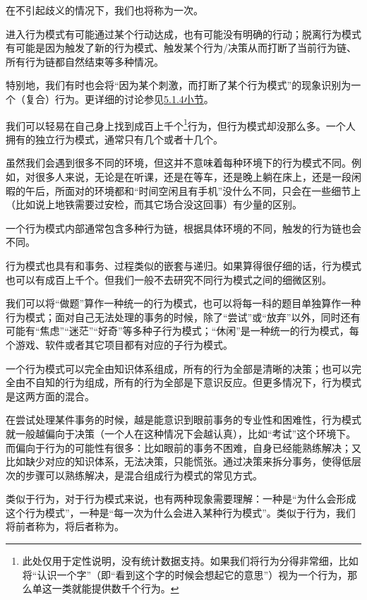 在不引起歧义的情况下，我们也将称为一次。
\begin{explain}
进入行为模式有可能通过某个行动达成，也有可能没有明确的行动；脱离行为模式有可能是因为触发了新的行为模式、触发某个行为/决策从而打断了当前行为链、所有行为链都自然结束等多种情况。

特别地，我们有时也会将“因为某个刺激，而打断了某个行为模式”的现象识别为一个（复合）行为。更详细的讨论参见\hyperref[sec:广义行为与多重触发]{5.1.4小节}。
\end{explain}
我们可以轻易在自己身上找到成百上千个\footnote{此处仅用于定性说明，没有统计数据支持。如果我们将行为分得非常细，比如将“认识一个字”（即“看到这个字的时候会想起它的意思”）视为一个行为，那么单这一类就能提供数千个行为。}行为，但行为模式却没那么多。一个人拥有的独立行为模式，通常只有几个或者十几个。
\begin{examples}
虽然我们会遇到很多不同的环境，但这并不意味着每种环境下的行为模式不同。例如，对很多人来说，无论是在听课，还是在等车，还是晚上躺在床上，还是一段闲暇的午后，所面对的环境都和“时间空闲且有手机”没什么不同，只会在一些细节上（比如说上地铁需要过安检，而其它场合没这回事）有少量的区别。

一个行为模式内部通常包含多种行为链，根据具体环境的不同，触发的行为链也会不同。
\end{examples}
行为模式也具有和事务、过程类似的嵌套与递归。如果算得很仔细的话，行为模式也可以有成百上千个。但我们一般不去研究不同行为模式之间的细微区别。
\begin{examples}
我们可以将“做题”算作一种统一的行为模式，也可以将每一科的题目单独算作一种行为模式；面对自己无法处理的事务的时候，除了“尝试”或“放弃”以外，同时还有可能有“焦虑”“迷茫”“好奇”等多种子行为模式；“休闲”是一种统一的行为模式，每个游戏、软件或者其它项目都有对应的子行为模式。
\end{examples}
一个行为模式可以完全由知识体系组成，所有的行为全部是清晰的决策；也可以完全由不自知的行为组成，所有的行为全部是下意识反应。但更多情况下，行为模式是这两方面的混合。
\begin{examples}
在尝试处理某件事务的时候，越是能意识到眼前事务的专业性和困难性，行为模式就一般越偏向于决策（一个人在这种情况下会越认真），比如“考试”这个环境下。而偏向于行为的可能性有很多：比如眼前的事务不困难，自身已经能熟练解决；又比如缺少对应的知识体系，无法决策，只能慌张。通过决策来拆分事务，使得低层次的步骤可以熟练解决，是混合组成行为模式的常见方式。
\end{examples}
类似于行为，对于行为模式来说，也有两种现象需要理解：一种是“为什么会形成这个行为模式”，一种是“每一次为什么会进入某种行为模式”。类似于行为，我们将前者称为，将后者称为。


